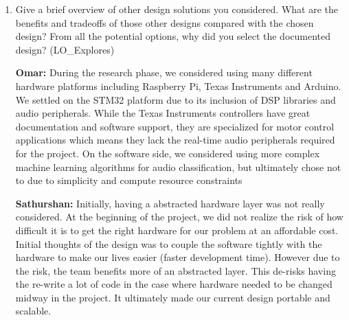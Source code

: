 \documentclass[12pt, titlepage]{article}
\begin{document}
\begin{enumerate}
  \textbf{Kalp:} I think the biggest limitation that we can see right now is the
  hardware limitations. The software that we're using for this project is good
  enough to handle the tasks that we're trying to accomplish within the software
  requirements, but the hardware limitations are what are holding us back
  slightly. With just better hardware (at the expense of higher cost), a lot of
  the issues we're dealing with could be mitigated.
  
  \textbf{Nirmal:} Given unlimited resources, we could have a more robust
  classification approach. The current approach of using PCA and LDA comes from
  not having computation power to use resources like SVM or neural networks
  taking in the full audio input. 

  \textbf{Jay:} The biggest limitation I see is tied to performance and the
  hardware we're working with. If we had more resources, we could definitely
  explore more powerful hardware and push the system to handle more complex
  processing or higher-resolution data. With more time and computing power, we
  could also refine the software to be more efficient and include features that
  aren't feasible right now.
  
  \item Give a brief overview of other design solutions you considered. What are
  the benefits and tradeoffs of those other designs compared with the chosen
  design?  From all the potential options, why did you select the documented
  design? (LO\_Explores)

  \textbf{Omar:} During the research phase, we considered using many different
  hardware platforms including Raspberry Pi, Texas Instruments and Arduino. We
  settled on the STM32 platform due to its inclusion of DSP libraries and audio
  peripherals. While the Texas Instruments controllers have great documentation
  and software support, they are specialized for motor control applications
  which means they lack the real-time audio peripherals required for the
  project. On the software side, we considered using more complex machine
  learning algorithms for audio classification, but ultimately chose not to due
  to simplicity and compute resource constraints

  \textbf{Sathurshan:} Initially, having a abstracted hardware layer was not
  really considered. At the beginning of the project, we did not realize the
  risk of how difficult it is to get the right hardware for our problem at
  an affordable cost. Initial thoughts of the design was to couple the software
  tightly with the hardware to make our lives easier (faster development time).
  However due to the risk, the team benefits more of an abstracted layer.
  This de-risks having the re-write a lot of code in the case where hardware
  needed to be changed midway in the project. It ultimately made our current
  design portable and scalable.


\end{enumerate}
\end{document}
